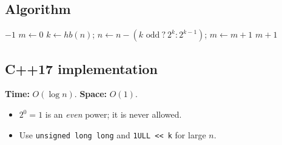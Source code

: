 \subsection*{Algorithm}
\begin{algorithmic}[1]
 \Return $-1$ \EndIf
\State $m\gets0$
  \State $k\gets hb(n)$; $n\gets n-(k\text{ odd}\ ?\ 2^k:2^{k-1})$; $m\gets m+1$
\EndWhile
\State \Return $m+1$
\end{algorithmic}


\subsection*{C++17 implementation}

\begin{complexitybox}
\textbf{Time:} $O(\log n)$. \textbf{Space:} $O(1)$.
\end{complexitybox}

\begin{pitfallbox}
\begin{itemize}
  \item $2^0=1$ is an \emph{even} power; it is never allowed.
  \item Use \texttt{unsigned long long} and \texttt{1ULL << k} for large $n$.
\end{itemize}
\end{pitfallbox}
